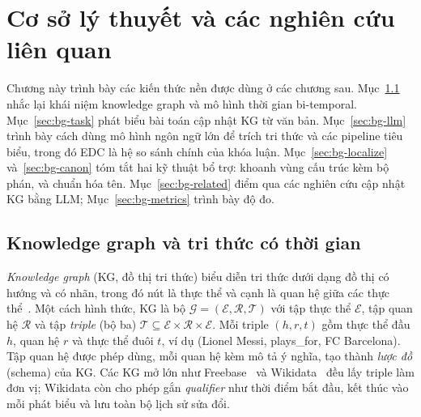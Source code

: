 \usetikzlibrary{shapes,arrows.meta,positioning,calc,fit,backgrounds,decorations.pathreplacing}

\chapter{Cơ sở lý thuyết và các nghiên cứu liên quan}\label{chap:background}

Chương này trình bày các kiến thức nền được dùng ở các chương sau.
Mục~\ref{sec:bg-kg} nhắc lại khái niệm knowledge graph và mô hình thời gian bi-temporal.
Mục~\ref{sec:bg-task} phát biểu bài toán cập nhật KG từ văn bản.
Mục~\ref{sec:bg-llm} trình bày cách dùng mô hình ngôn ngữ lớn để trích tri thức và các pipeline tiêu biểu, trong đó EDC là hệ so sánh chính của khóa luận.
Mục~\ref{sec:bg-localize} và~\ref{sec:bg-canon} tóm tắt hai kỹ thuật bổ trợ: khoanh vùng cấu trúc kèm bộ phán, và chuẩn hóa tên.
Mục~\ref{sec:bg-related} điểm qua các nghiên cứu cập nhật KG bằng LLM; Mục~\ref{sec:bg-metrics} trình bày độ đo.

\section{Knowledge graph và tri thức có thời gian}\label{sec:bg-kg}

\textit{Knowledge graph} (KG, đồ thị tri thức) biểu diễn tri thức dưới dạng đồ thị có hướng và có nhãn, trong đó nút là thực thể và cạnh là quan hệ giữa các thực thể~\cite{hogan2021kg}.
Một cách hình thức, KG là bộ $\mathcal{G} = (\mathcal{E}, \mathcal{R}, \mathcal{T})$ với tập thực thể $\mathcal{E}$, tập quan hệ $\mathcal{R}$ và tập \textit{triple} (bộ ba) $\mathcal{T} \subseteq \mathcal{E} \times \mathcal{R} \times \mathcal{E}$.
Mỗi triple $(h, r, t)$ gồm thực thể đầu $h$, quan hệ $r$ và thực thể đuôi $t$, ví dụ (Lionel Messi, plays\_for, FC Barcelona).
Tập quan hệ được phép dùng, mỗi quan hệ kèm mô tả ý nghĩa, tạo thành \textit{lược đồ} (schema) của KG.
Các KG mở lớn như Freebase~\cite{bollacker2008freebase} và Wikidata~\cite{vrandecic2014wikidata} đều lấy triple làm đơn vị; Wikidata còn cho phép gắn \textit{qualifier} như thời điểm bắt đầu, kết thúc vào mỗi phát biểu và lưu toàn bộ lịch sử sửa đổi.

